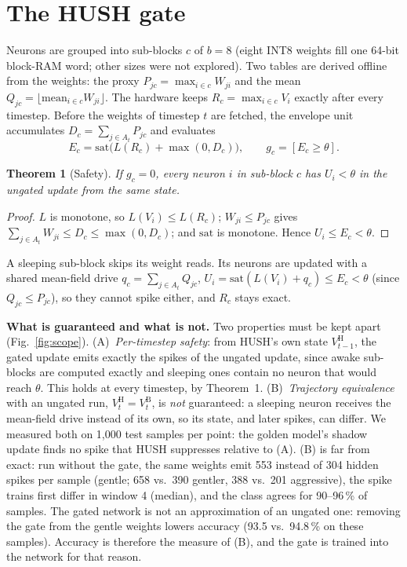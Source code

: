\documentclass[conference]{IEEEtran}
\newtheorem{theorem}{Theorem}
\begin{document}
\section{The HUSH gate}
Neurons are grouped into sub-blocks $c$ of $b=8$ (eight INT8 weights fill one 64-bit block-RAM word; other sizes
were not explored). Two tables are derived offline from the weights: the proxy
$P_{jc}=\max_{i\in c} W_{ji}$ and the mean $Q_{jc}=\lfloor \mathrm{mean}_{i\in c} W_{ji}\rfloor$. The hardware keeps
$R_c=\max_{i\in c} V_i$ exactly after every timestep. Before the weights of timestep $t$ are fetched, the envelope
unit accumulates $D_c=\sum_{j\in A_t} P_{jc}$ and evaluates
\begin{equation}
E_c=\mathrm{sat}\big(L(R_c)+\max(0,D_c)\big),\qquad g_c=[E_c\ge\theta].
\end{equation}
\begin{theorem}[Safety]
If $g_c=0$, every neuron $i$ in sub-block $c$ has $U_i<\theta$ in the ungated update from the same state.
\end{theorem}
\begin{proof}
$L$ is monotone, so $L(V_i)\le L(R_c)$; $W_{ji}\le P_{jc}$ gives $\sum_{j\in A_t}W_{ji}\le D_c\le\max(0,D_c)$; and
$\mathrm{sat}$ is monotone. Hence $U_i\le E_c<\theta$.
\end{proof}
A sleeping sub-block skips its weight reads. Its neurons are updated with a shared mean-field drive
$q_c=\sum_{j\in A_t}Q_{jc}$, $U_i=\mathrm{sat}(L(V_i)+q_c)\le E_c<\theta$ (since $Q_{jc}\le P_{jc}$), so they cannot spike either, and $R_c$ stays exact.

\textbf{What is guaranteed and what is not.} Two properties must be kept apart (Fig.~\ref{fig:scope}).
(A)~\emph{Per-timestep safety}: from HUSH's own state $V^{\mathrm H}_{t-1}$, the gated update emits exactly the
spikes of the ungated update, since awake sub-blocks are computed exactly and sleeping ones contain no neuron that
would reach $\theta$. This holds at every timestep, by Theorem~1. (B)~\emph{Trajectory equivalence} with an ungated
run, $V^{\mathrm H}_t=V^{\mathrm B}_t$, is \emph{not} guaranteed: a sleeping neuron receives the mean-field drive
instead of its own, so its state, and later spikes, can differ. We measured both on 1,000 test samples per point:
the golden model's shadow update finds no spike that HUSH suppresses relative to (A). (B) is far from exact: run
without the gate, the same weights emit 553 instead of 304 hidden spikes per sample (gentle; 658 vs.\ 390 gentler,
388 vs.\ 201 aggressive), the spike trains first differ in window 4 (median), and the class agrees for 90--96\,\% of
samples. The gated network is not an approximation of an ungated one: removing the gate from the gentle weights
lowers accuracy (93.5 vs.\ 94.8\,\% on these samples). Accuracy is therefore the measure of (B), and the gate is
trained into the network for that reason.
\end{document}
